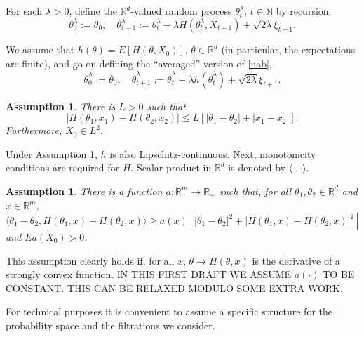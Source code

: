 \documentclass[a4paper,draft]{article}
\newtheorem{assumption}[theorem]{Assumption}
\begin{document}
For each $\lambda>0$, define the $\mathbb{R}^d$-valued
random process $\theta^{\lambda}_t$, $t\in\mathbb{N}$ by recursion:
\begin{equation}\label{nab}
\theta^{\lambda}_0:=\theta_0,\quad \theta^{\lambda}_{t+1}:=\theta^{\lambda}_t-\lambda H(\theta^{\lambda}_t,X_{t+1})+\sqrt{2\lambda}\xi_{t+1}.
\end{equation}

We assume that $h(\theta)=E[H(\theta,X_0)]$, $\theta\in\mathbb{R}^d$
(in particular, the expectations are finite), and go on
defining the ``averaged'' version of \eqref{nab},
\begin{equation}\label{aver}
\overline{\theta}^{\lambda}_0:=\theta_0,\quad
\overline{\theta}^{\lambda}_{t+1}:=\overline{\theta}^{\lambda}_t-\lambda
h(\overline{\theta}^{\lambda}_t)+\sqrt{2\lambda}\xi_{t+1}.
\end{equation}

\begin{assumption}\label{lip} There is $L>0$ such that
$$
|H(\theta_1,x_1)-H(\theta_2,x_2)|\leq L[|\theta_1-\theta_2|+|x_1-x_2|].
$$
Furthermore, $X_0\in L^2$.
\end{assumption}

Under Assumption \ref{lip}, $h$ is also Lipschitz-continuous. Next, monotonicity conditions are required for $H$. Scalar product in $\mathbb{R}^d$
is denoted by $\langle \cdot,\cdot\rangle$.

\begin{assumption}\label{diss} There is a function $a:\mathbb{R}^m\to\mathbb{R}_+$ such that, for all $\theta_1,\theta_2\in\mathbb{R}^d$ and $x\in\mathbb{R}^m$,
\begin{equation}\label{montre}
\langle \theta_1-\theta_2,H(\theta_1,x)-H(\theta_2,x)\rangle\geq
a(x)[|\theta_1-\theta_2|^2 + |H(\theta_1,x)-H(\theta_2,x)|^2]
\end{equation}
and $Ea(X_0)>0$.
\end{assumption}

This assumption clearly holds if, for all $x$, $\theta\to H(\theta,x)$
is the derivative of a strongly convex function.
IN THIS FIRST DRAFT WE ASSUME $a(\cdot)$ TO BE CONSTANT. THIS CAN BE
RELAXED MODULO SOME EXTRA WORK.

For technical purposes it is convenient to assume a specific structure
for the probability space and the filtrations we consider.
\end{document}
